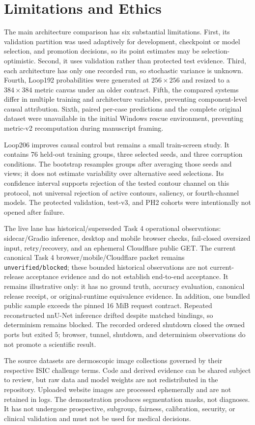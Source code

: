 \section{Limitations and Ethics}

The main architecture comparison has six substantial limitations. First, its validation partition was used adaptively for development, checkpoint or model selection, and promotion decisions, so its point estimates may be selection-optimistic. Second, it uses validation rather than protected test evidence. Third, each architecture has only one recorded run, so stochastic variance is unknown. Fourth, Loop192 probabilities were generated at $256\times256$ and resized to a $384\times384$ metric canvas under an older contract. Fifth, the compared systems differ in multiple training and architecture variables, preventing component-level causal attribution. Sixth, paired per-case predictions and the complete original dataset were unavailable in the initial Windows rescue environment, preventing metric-v2 recomputation during manuscript framing.

Loop206 improves causal control but remains a small train-screen study. It contains 76 held-out training groups, three selected seeds, and three corruption conditions. The bootstrap resamples groups after averaging those seeds and views; it does not estimate variability over alternative seed selections. Its confidence interval supports rejection of the tested contour channel on this protocol, not universal rejection of active contours, saliency, or fourth-channel models. The protected validation, test-v3, and PH2 cohorts were intentionally not opened after failure.

The live lane has historical/superseded Task 4 operational observations: sidecar/Gradio inference, desktop and mobile browser checks, fail-closed oversized input, retry/recovery, and an ephemeral Cloudflare public GET. The current canonical Task 4 browser/mobile/Cloudflare packet remains \texttt{unverified/blocked}; these bounded historical observations are not current-release acceptance evidence and do not establish end-to-end acceptance. It remains illustrative only: it has no ground truth, accuracy evaluation, canonical release receipt, or original-runtime equivalence evidence. In addition, one bundled public sample exceeds the pinned 16 MiB request contract. Repeated reconstructed nnU-Net inference drifted despite matched bindings, so determinism remains blocked. The recorded ordered shutdown closed the owned ports but exited 5; browser, tunnel, shutdown, and determinism observations do not promote a scientific result.

The source datasets are dermoscopic image collections governed by their respective ISIC challenge terms. Code and derived evidence can be shared subject to review, but raw data and model weights are not redistributed in the repository. Uploaded website images are processed ephemerally and are not retained in logs. The demonstration produces segmentation masks, not diagnoses. It has not undergone prospective, subgroup, fairness, calibration, security, or clinical validation and must not be used for medical decisions.
